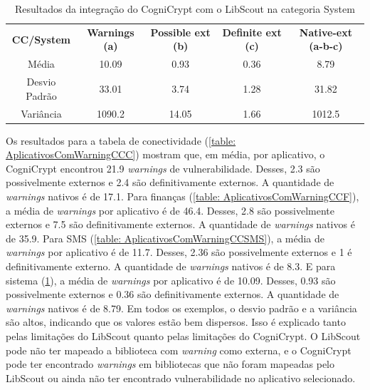 \begin{table}[!htbp]
  \centering
  \small
  \begin{tabular}{|c|c|c|c|c|}
  
\textbf{CC/System}   & \textbf{Warnings (a)}   &  \textbf{Possible ext (b)}     &  \textbf{Definite ext (c)} &  \textbf{Native-ext (a-b-c)} \\ 
Média                      & \num{10.09}              &  \num{0.93}                                         & \num{0.36}                                        & \num{8.79}                                                    \\
Desvio Padrão              & \num{33.01}              &  \num{3.74}                                         & \num{1.28}                                        & \num{31.82}  \\                                                  
Variância                  & \num{1090.2}            &  \num{14.05}                                         & \num{1.66}                                       & \num{1012.5}  \\                                                  
\end{tabular}
    
  \caption{Resultados da integração do CogniCrypt com o LibScout na categoria System}
\label{table: AplicativosComWarningCCS}
\end{table}

Os resultados para a tabela de conectividade (\ref{table: AplicativosComWarningCCC}) mostram que, em média, por aplicativo, o CogniCrypt encontrou \num{21.9} \textit{warnings} de vulnerabilidade. Desses, \num{2.3} são possivelmente externos e \num{2.4} são definitivamente externos. A quantidade de \textit{warnings} nativos é de \num{17.1}.
Para finanças (\ref{table: AplicativosComWarningCCF}), a média de \textit{warnings} por aplicativo é de \num{46.4}. Desses, \num{2.8} são possivelmente externos e \num{7.5} são definitivamente externos. A quantidade de \textit{warnings} nativos é de \num{35.9}. 
Para SMS (\ref{table: AplicativosComWarningCCSMS}), a média de \textit{warnings} por aplicativo é de \num{11.7}. Desses, \num{2.36} são possivelmente externos e \num{1} é definitivamente externo. A quantidade de \textit{warnings} nativos é de \num{8.3}.
E para sistema (\ref{table: AplicativosComWarningCCS}), a média de \textit{warnings} por aplicativo é de \num{10.09}. Desses, \num{0.93} são possivelmente externos e \num{0.36} são definitivamente externos. A quantidade de \textit{warnings} nativos é de \num{8.79}.
Em todos os exemplos, o desvio padrão e a variância são altos, indicando que os valores estão bem dispersos. Isso é explicado tanto pelas limitações do LibScout quanto pelas limitações do CogniCrypt. O LibScout pode não ter mapeado a biblioteca com \textit{warning} como externa, e o CogniCrypt pode ter encontrado \textit{warnings} em bibliotecas que não foram mapeadas pelo LibScout ou ainda não ter encontrado vulnerabilidade no aplicativo selecionado.

